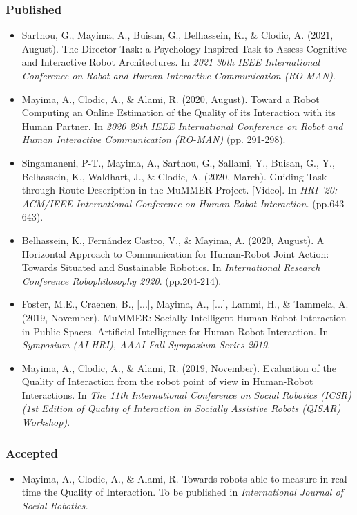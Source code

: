 \documentclass[a4paper,11pt,twoside]{StyleThese}
\begin{document}
\subsubsection*{Published}
\begin{itemize}
\item Sarthou, G., Mayima, A., Buisan, G., Belhassein, K., \& Clodic, A. (2021, August). The Director Task: a Psychology-Inspired Task to Assess Cognitive and Interactive Robot Architectures. In \textit{2021 30th IEEE International Conference on Robot and Human Interactive Communication (RO-MAN)}.

\item  Mayima, A., Clodic, A., \& Alami, R. (2020, August). Toward a Robot Computing an Online Estimation of the Quality of its Interaction with its Human Partner. In \textit{2020 29th IEEE International Conference on Robot and Human Interactive Communication (RO-MAN)} (pp. 291-298).

\item Singamaneni, P-T., Mayima, A., Sarthou, G., Sallami, Y., Buisan, G., Y., Belhassein, K., Waldhart, J., \& Clodic, A. (2020, March). Guiding Task through Route Description in the MuMMER Project. [Video]. In \textit{HRI '20: ACM/IEEE International Conference on Human-Robot Interaction.} (pp.643-643).

\item Belhassein, K., Fernández Castro, V., \& Mayima, A. (2020, August). A Horizontal Approach to Communication for Human-Robot Joint Action: Towards Situated and Sustainable Robotics. In \textit{International Research Conference Robophilosophy 2020}. (pp.204-214).

\item Foster, M.E., Craenen, B., [...], Mayima, A., [...], Lammi, H., \& Tammela, A. (2019, November). MuMMER: Socially Intelligent Human-Robot Interaction in Public Spaces. Artificial Intelligence for Human-Robot Interaction. In \textit{Symposium (AI-HRI), AAAI Fall Symposium Series 2019}.

\item  Mayima, A., Clodic, A., \& Alami, R. (2019, November). Evaluation of the Quality of Interaction from the robot point of view in Human-Robot Interactions. In \textit{ The 11th International Conference on Social Robotics (ICSR) (1st Edition of Quality of Interaction in Socially Assistive Robots (QISAR) Workshop)}.
\end{itemize}

\subsubsection*{Accepted}
\begin{itemize}
\item Mayima, A., Clodic, A., \& Alami, R. Towards robots able to measure in real-time the Quality of Interaction. To be published in \textit{International Journal of Social Robotics.} 
\end{itemize}
\end{document}
